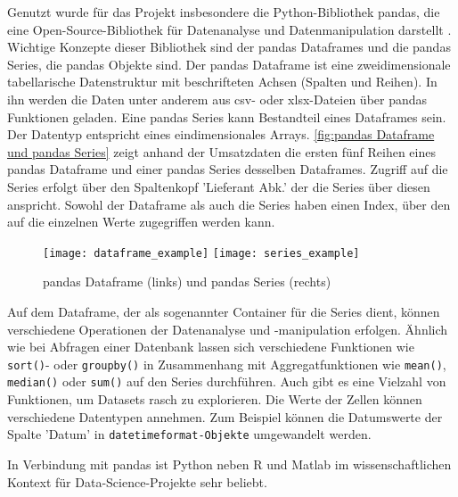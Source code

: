     
    Genutzt wurde für das Projekt insbesondere die Python-Bibliothek pandas, die eine Open-Source-Bibliothek für Datenanalyse und 
    Datenmanipulation darstellt \cite[vgl.][]{pandas_pandas_2021}. 
    Wichtige Konzepte dieser Bibliothek sind der pandas Dataframes und die pandas Series, die pandas Objekte sind. Der pandas Dataframe ist eine zweidimensionale 
    tabellarische Datenstruktur mit beschrifteten Achsen (Spalten und Reihen). In ihn
    werden die Daten unter anderem aus csv- oder xlsx-Dateien über pandas Funktionen geladen.
    Eine pandas Series kann Bestandteil eines Dataframes sein. Der Datentyp entspricht eines eindimensionales Arrays. \autoref{fig:pandas Dataframe und pandas Series} zeigt anhand der Umsatzdaten die ersten fünf Reihen
    eines pandas Dataframe und einer pandas Series desselben Dataframes. Zugriff auf die Series erfolgt über
    den Spaltenkopf 'Lieferant Abk.' der die Series über diesen anspricht. Sowohl der Dataframe als auch die Series haben einen Index, 
    über den auf die einzelnen Werte zugegriffen werden kann. 
    
    
    \begin{figure}[h]
        \centering
            \texttt{[image: dataframe\_example]}
            \hspace{1cm}
            \texttt{[image: series\_example]}
            \caption{pandas Dataframe (links) und pandas Series (rechts)}
            \label{fig:pandas Dataframe und pandas Series}
    \end{figure}
    
    Auf dem Dataframe, der als sogenannter Container für die Series dient, können verschiedene Operationen der Datenanalyse und 
    -manipulation erfolgen. Ähnlich wie bei Abfragen einer Datenbank lassen sich verschiedene Funktionen wie \texttt{sort()}- oder \texttt{groupby()}
    in Zusammenhang mit Aggregatfunktionen wie \texttt{mean()}, \texttt{median()} oder \texttt{sum()} auf den Series durchführen.
    Auch gibt es eine Vielzahl von Funktionen, um Datasets rasch zu explorieren. Die Werte der Zellen können verschiedene Datentypen
    annehmen. Zum Beispiel können die Datumswerte der Spalte 'Datum' in \texttt{datetimeformat-Objekte} umgewandelt werden.

    In Verbindung mit pandas ist Python neben \textsf{R} und Matlab im wissenschaftlichen Kontext für Data-Science-Projekte sehr beliebt.
    
